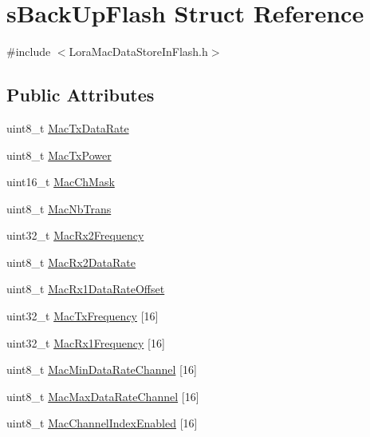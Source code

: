 \hypertarget{structs_back_up_flash}{}\section{s\+Back\+Up\+Flash Struct Reference}
\label{structs_back_up_flash}


{\ttfamily \#include $<$Lora\+Mac\+Data\+Store\+In\+Flash.\+h$>$}

\subsection*{Public Attributes}
\begin{DoxyCompactItemize}
\item 
uint8\+\_\+t \mbox{\hyperlink{structs_back_up_flash_a408ea06f64214043ee41e5de12cab2eb}{Mac\+Tx\+Data\+Rate}}
\item 
uint8\+\_\+t \mbox{\hyperlink{structs_back_up_flash_a37e09d6a2caa964e66d5ee8ac5f7e3a0}{Mac\+Tx\+Power}}
\item 
uint16\+\_\+t \mbox{\hyperlink{structs_back_up_flash_a4295c7686f916c144783dc2304257338}{Mac\+Ch\+Mask}}
\item 
uint8\+\_\+t \mbox{\hyperlink{structs_back_up_flash_a1770888f794fdf84265d196b2e2c8037}{Mac\+Nb\+Trans}}
\item 
uint32\+\_\+t \mbox{\hyperlink{structs_back_up_flash_aa6053682376d49efcba40e5cc3fd3154}{Mac\+Rx2\+Frequency}}
\item 
uint8\+\_\+t \mbox{\hyperlink{structs_back_up_flash_a8e1465c70a778678ac22a136bde59966}{Mac\+Rx2\+Data\+Rate}}
\item 
uint8\+\_\+t \mbox{\hyperlink{structs_back_up_flash_a5b5f63bc5dd29b8ccb149e6f20037981}{Mac\+Rx1\+Data\+Rate\+Offset}}
\item 
uint32\+\_\+t \mbox{\hyperlink{structs_back_up_flash_aed62b6a6b327e3999d01e7eb21681eb5}{Mac\+Tx\+Frequency}} \mbox{[}16\mbox{]}
\item 
uint32\+\_\+t \mbox{\hyperlink{structs_back_up_flash_a195dfadb183b5ad2b8990791e2c517c9}{Mac\+Rx1\+Frequency}} \mbox{[}16\mbox{]}
\item 
uint8\+\_\+t \mbox{\hyperlink{structs_back_up_flash_a1c212cc8590aa2279d04306b87361bcd}{Mac\+Min\+Data\+Rate\+Channel}} \mbox{[}16\mbox{]}
\item 
uint8\+\_\+t \mbox{\hyperlink{structs_back_up_flash_aae081cfdc99a8f60da6df8742b7dfda1}{Mac\+Max\+Data\+Rate\+Channel}} \mbox{[}16\mbox{]}
\item 
uint8\+\_\+t \mbox{\hyperlink{structs_back_up_flash_a8c75ddd0e48e4a9d3f0d8f44b989d10f}{Mac\+Channel\+Index\+Enabled}} \mbox{[}16\mbox{]}

\end{DoxyCompactItemize}
